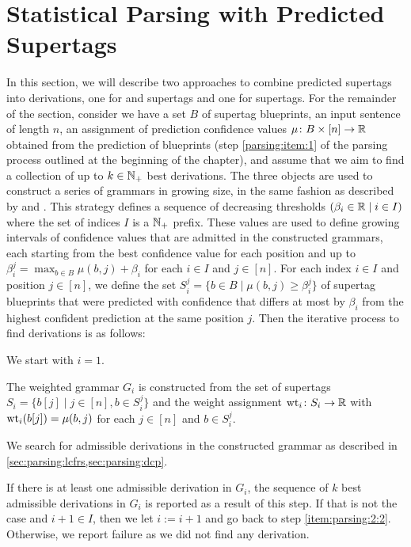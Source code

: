 \documentclass[../../document.tex]{subfiles}
\begin{document}
    \section{Statistical Parsing with Predicted Supertags}\label{sec:parsing}
    In this section, we will describe two approaches to combine predicted supertags into derivations, one for  and  supertags and one for  supertags.
    For the remainder of the section, consider we have a set \(B\) of supertag blueprints, an input sentence of length \(n\), an assignment of prediction confidence values \(\mu\colon B \times [n] \to \mathbb{R}\) obtained from the prediction of blueprints (step \ref{parsing:item:1} of the parsing process outlined at the beginning of the chapter), and assume that we aim to find a collection of up to \(k \in \mathbb{N}_+\) best derivations.
    The three objects are used to construct a series of grammars in growing size, in the same fashion as described by \citet[Section 5.1]{Clark04} and \citet[Section 2.2.2]{Auli12}.
    This strategy defines a sequence of decreasing thresholds \((\beta_i \in \mathbb{R} \mid i \in I)\) where the set of indices \(I\) is a \(\mathbb{N}_+\) prefix.
    These values are used to define growing intervals of confidence values that are admitted in the constructed grammars, each starting from the best confidence value for each position and up to \(\beta_i^j = \max_{b \in B} \mu(b, j) + \beta_i\) for each \(i \in I\) and \(j \in [n]\).
    For each index \(i \in I\) and position \(j \in [n]\), we define the set \(S_i^j = \{ b \in B \mid \mu(b, j) \ge \beta^j_i \}\) of supertag blueprints that were predicted with confidence that differs at most by \(\beta_i\) from the highest confident prediction at the same position \(j\).
    Then the iterative process to find derivations is as follows:
    \begin{compactenum}
        \item We start with \(i = 1\).
        \item \label{item:parsing:2:2}
            The weighted grammar \(G_i\) is constructed from the set of supertags \(S_i = \{b[j] \mid j \in [n], b \in S_i^j \}\) and the weight assignment \(\operatorname{wt}_{i}\colon S_i \to \mathbb{R}\) with \(\operatorname{wt}_i(b[j]) = \mu(b, j)\) for each \(j \in [n]\) and \(b \in S_i^j\).
        \item We search for admissible derivations in the constructed grammar as described in \cref{sec:parsing:lcfrs,sec:parsing:dcp}.
        \item
            If there is at least one admissible derivation in \(G_i\), the sequence of \(k\) best admissible derivations in \(G_i\) is reported as a result of this step.
            If that is not the case and \(i+1 \in I\), then we let \(i := i+1\) and go back to step \ref{item:parsing:2:2}.
            Otherwise, we report failure as we did not find any derivation.
    \end{compactenum}
\end{document}
